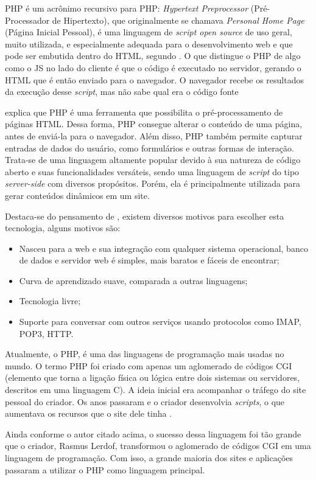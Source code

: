 PHP é um acrônimo recursivo para PHP: \textit{Hypertext Preprocessor} (Pré-Processador de Hipertexto), que originalmente se chamava \textit{Personal Home Page} (Página Inicial Pessoal), é uma linguagem de \textit{script open source} de uso geral, muito utilizada, e especialmente adequada para o desenvolvimento web e que pode ser embutida dentro do HTML, segundo . O que distingue o PHP de algo como o JS no lado do cliente é que o código é executado no servidor, gerando o HTML que é então enviado para o navegador. O navegador recebe os resultados da execução desse \textit{script}, mas não sabe qual era o código fonte

 explica que PHP é uma ferramenta que possibilita o pré-processamento de páginas HTML. Dessa forma, PHP consegue alterar o conteúdo de uma página, antes de enviá-la para o navegador. Além disso, PHP também permite capturar entradas de dados do usuário, como formulários e outras formas de interação. Trata-se de uma linguagem altamente popular devido à sua natureza de código aberto e suas funcionalidades versáteis, sendo uma linguagem de \textit{script} do tipo \textit{server-side} com diversos propósitos. Porém, ela é principalmente utilizada para gerar conteúdos dinâmicos em um site.

Destaca-se do pensamento de , existem diversos motivos para escolher esta tecnologia, alguns motivos são:

\begin{itemize}
    \item Nasceu para a web e sua integração com qualquer sistema operacional, banco de dados e servidor web é simples, mais baratos e fáceis de encontrar;
    \item Curva de aprendizado suave, comparada a outras linguagens;
    \item Tecnologia livre;
    \item Suporte para conversar com outros serviços usando protocolos como IMAP, POP3, HTTP.
\end{itemize}

Atualmente, o PHP, é uma das linguagens de programação mais usadas no mundo. O termo PHP foi criado com apenas um aglomerado de códigos CGI (elemento que torna a ligação física ou lógica entre dois sistemas ou servidores, descritos em uma linguagem C). A ideia inicial era acompanhar o tráfego do site pessoal do criador. Os anos passaram e o criador desenvolvia \textit{scripts}, o que aumentava os recursos que o site dele tinha \cite{phpdevelopment}.

Ainda conforme o autor citado acima, o sucesso dessa linguagem foi tão grande que o criador, Rasmus Lerdof, transformou o aglomerado de códigos CGI em uma linguagem de programação. Com isso, a grande maioria dos sites e aplicações passaram a utilizar o PHP como linguagem principal.

